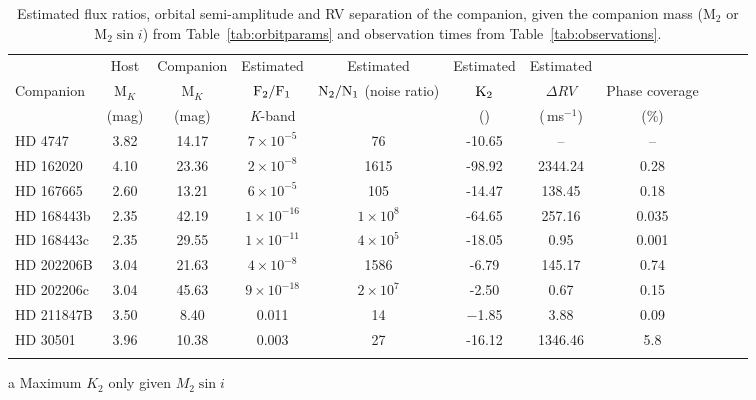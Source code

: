 \begin{table*}
        \small
        \centering
       \begin{threeparttable}[b]
        \caption{Estimated flux ratios, orbital semi-amplitude and RV separation of the companion, given the companion mass (\(\textrm{M}_{2}\) or \(\textrm{M}_{2} \sin{i}\)) from Table~\ref{tab:orbitparams} and observation times from Table~\ref{tab:observations}.} 
        \begin{tabular}{l c c c c c c c c c c}%
            \toprule
            & Host& Companion & Estimated & Estimated & Estimated & Estimated & & \\  %
            Companion & M$_{K}$ & M$_{K}$ & \(\rm F_{2}/F_{1} \) & \(\rm N_{2}/N_{1} \) (noise ratio) & \(\rm K_2\) & \(\Delta RV\) & Phase coverage\\
            & (mag) & (mag)& \textit{K}-band & & (\kmps{}) & (\,ms\(^{-1}\)) & (\%)\\
            \midrule
            {HD 4747} & 3.82 & 14.17 & \(7\times10^{-5} \) & 76 & -10.65 & -- & --\\  %
            {HD 162020} & 4.10 & 23.36 & \(2\times10^{-8} \) & 1615 & -98.92\tnote{a} & 2344.24 & 0.28\\  %
            {HD 167665} & 2.60 & 13.21 & \(6\times10^{-5} \) & 105 & -14.47\tnote{a} & 138.45 & 0.18\\  %
            {HD 168443b} & 2.35 & 42.19 & \(1\times10^{-16} \) & \(1\times10^{8} \) & -64.65\tnote{a}& 257.16 & 0.035\\ 
            {HD 168443c} & 2.35 & 29.55 & \(1\times10^{-11} \) & \(4\times10^{5} \) & -18.05\tnote{a} & 0.95 & 0.001\\  %
            {HD 202206}B & 3.04& 21.63 & \(4\times10^{-8} \) & 1586 & -6.79 & 145.17 & 0.74\\  %
            {HD 202206}c & 3.04& 45.63 & \(9\times10^{-18}\) & \(2\times10^{7} \) & -2.50 & 0.67 & 0.15\\  %
            {HD 211847}B & 3.50 & 8.40 & 0.011 & 14 & $-$1.85 & 3.88 & 0.09\\  %
            {HD 30501} & 3.96 & 10.38 & 0.003 & 27 & -16.12 & 1346.46 & 5.8\\
            \bottomrule& & 
            \end{tabular}
            \label{tab:estimatedparameters}
    \begin{tablenotes}
        \item[a] {Maximum \(K_2\) only given \(M_2 \sin{i}\)}
      \end{tablenotes}
  \end{threeparttable}

\end{table*}